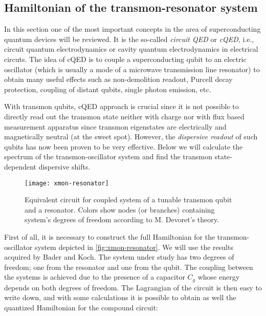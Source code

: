\subsection{Hamiltonian of the transmon-resonator system}

In this section one of the most important concepts in the area of superconducting quantum devices will be reviewed. It is the so-called \textit{circuit QED} or \textit{cQED}, i.e., circuit quantum electrodynamics or cavity quantum electrodynamics in electrical circuts\cite{Blais2004}. The idea of cQED is to couple a superconducting qubit to an electric oscillator (which is usually a mode of a microwave transmission line resonator) to obtain many useful effects such as non-demolition readout\cite{Blais2004}, Purcell decay protection\cite{Koch2007}, coupling of distant qubits\cite{Majer2007}, single photon emission\cite{bozyigit2011}, etc.

With transmon qubits, cQED approach is crucial since it is not possible to directly read out the transmon state neither with charge nor with flux based measurement apparatus since transmon eigenstates are electrically and magnetically neutral (at the sweet spot). However, the \textit{dispersive readout}\cite{Blais2004} of such qubits has now been proven to be very effective. Below we will calculate the spectrum of the transmon-oscillator system and find the transmon state-dependent dispersive shifts.

\begin{figure}
\centering
\texttt{[image: xmon-resonator]}
\caption{Equivalent circuit for coupled system of a tunable transmon qubit and a resonator. Colors show nodes (or branches) containing system's degrees of freedom according to M. Devoret's theory\cite{Devoret1995}.}
\label{fig:xmon-resonator}
\end{figure}

First of all, it is necessary to construct the full Hamiltonian for the transmon-oscillator system depicted in \autoref{fig:xmon-resonator}. We will use the results acquired by Bader\cite{Bader2013} and Koch\cite{Koch2007}. The system under study has two degrees of freedom; one from the resonator and one from the qubit. The coupling between the systems is achieved due to the presence of a capacitor $C_g$ whose energy depends on both degrees of freedom. The Lagrangian of the circuit is then easy to write down, and with some calculations it is possible to obtain as well the quantized Hamiltonian for the compound circuit:

